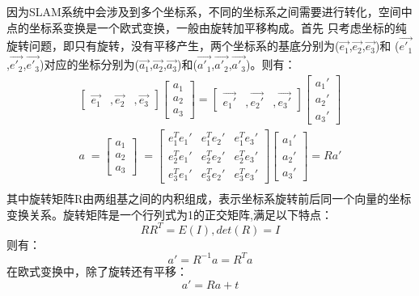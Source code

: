 因为SLAM系统中会涉及到多个坐标系，不同的坐标系之间需要进行转化，空间中点的坐标系变换是一个欧式变换，一般由旋转加平移构成。首先
只考虑坐标的纯旋转问题，即只有旋转，没有平移产生，两个坐标系的基底分别为($\vec {e_1}$,$\vec {e_2}$,$\vec {e_3}$)和
($\vec {e'_ 1}$,$\vec {e'_2}$,$\vec {e'_3}$)对应的坐标分别为($\vec {a_1}$,$\vec {a_2}$,$\vec {a_3}$)和($\vec {a'_1}$,$\vec {a'_2}$,$\vec {a'_3}$)。则有：
\begin{equation}
\begin{array}{l}\begin{bmatrix}\overrightarrow{e_1}&,\overrightarrow{e_2}&,\overrightarrow{e_3}\end{bmatrix}
\begin{bmatrix}a_1\\a_2\\a_3\end{bmatrix}=\begin{bmatrix}\overrightarrow{e_1'}&,\overrightarrow{e_2'}&,\overrightarrow{e_3'}\end{bmatrix}
\begin{bmatrix}a_1'\\a_2'\\a_3'\end{bmatrix}\\a\;=
\begin{bmatrix}a_1\\a_2\\a_3\end{bmatrix}\;=
\begin{bmatrix}e_1^Te_1'&e_1^Te_2'&e_1^Te_3'\\e_2^Te_1'&e_2^Te_2'&e_2^Te_3'\\e_3^Te_1'&e_3^Te_2'&e_3^Te_3'\end{bmatrix}
\begin{bmatrix}a_1'\\a_2'\\a_3'\end{bmatrix}=Ra'\\\end{array}
\end{equation}
其中旋转矩阵R由两组基之间的内积组成，表示坐标系旋转前后同一个向量的坐标变换关系。旋转矩阵是一个行列式为1的正交矩阵,满足以下特点：
\begin{equation}RR^T=E(I),det(R)=I\end{equation}
则有：
\begin{equation}a'=R^{-1}a=R^Ta\end{equation}
在欧式变换中，除了旋转还有平移：
\begin{equation}a'=Ra+t\end{equation}
